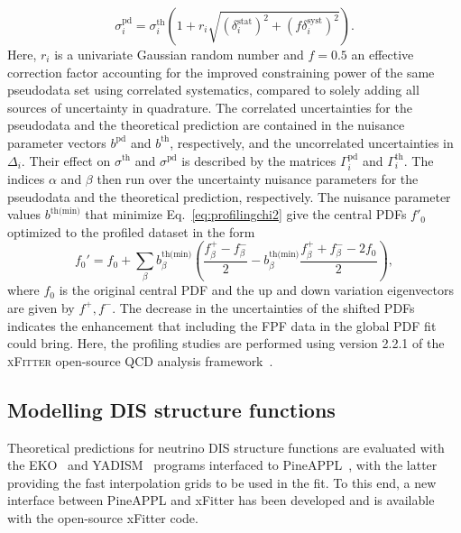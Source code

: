 \begin{equation}
\sigma_i^{\textrm{pd}}
=
\sigma_i^{\textrm{th}}
\left( 1 + r_i \sqrt{     (\delta_i^{\textrm{stat}})^2
                      + (f \delta_i^{\textrm{syst}})^2 }
\right).
\end{equation}
Here, $r_i$ is a univariate Gaussian random number and $f = 0.5$ an effective correction factor 
accounting for the improved constraining power of the same pseudodata set using correlated systematics, compared to solely adding all sources of uncertainty in quadrature.
%
The correlated uncertainties for the pseudodata and the theoretical prediction 
are contained in the nuisance parameter vectors $b^{\textrm{pd}}$ and $b^{\textrm{th}}$, respectively, and the uncorrelated uncertainties in $\Delta_i$.
%
Their effect on $\sigma^{\textrm{th}}$ and $\sigma^{\textrm{pd}}$
is described by the matrices $\Gamma_i^{\textrm{pd}}$ and $\Gamma_i^{\textrm{th}}$.
The indices $\alpha$ and $\beta$ then run over the uncertainty nuisance parameters for the pseudodata and the theoretical prediction, respectively.
%
The nuisance parameter values $b^{\textrm{th(min)}}$ that minimize Eq.~\eqref{eq:profilingchi2} give the central PDFs $f'_0$ optimized to the profiled dataset in the form
\begin{equation}
f_0' = f_0
      + \sum_\beta b_\beta^{\textrm{th(min)}} 
        \left(  \frac{f_\beta^+   -  f_\beta^- }{2}
              -    b_\beta^{\textrm{th(min)}}
                \frac{f_\beta^+ + f_\beta^- - 2f_0}{2}
        \right),
\end{equation}
where $f_0$ is the original central PDF and the up and down variation eigenvectors are given by $f^+, f^-$. The decrease in the uncertainties of the shifted PDFs indicates the enhancement that including the FPF data in the global PDF fit could bring. Here, the profiling studies are performed using version 2.2.1 of the \textsc{xFitter} open-source QCD analysis framework~\cite{Alekhin:2014irh, Bertone:2017tig, xFitter:2022zjb, xFitter:web}.
%


\subsection{Modelling DIS structure functions}

Theoretical predictions for neutrino DIS structure functions are evaluated with the {\sc\small EKO}~\cite{Candido:2022tld}
and {\sc\small YADISM}~\cite{yadism,Candido:2023utz} programs interfaced to {\sc\small PineAPPL}~\cite{Carrazza:2020gss, christopher_schwan_2023_7995675}, with the latter providing the fast interpolation grids to be used in the fit.
%
To this end, a new interface between  {\sc\small PineAPPL} and {\sc\small xFitter} has been developed and is available with the open-source {\sc\small xFitter} code.
